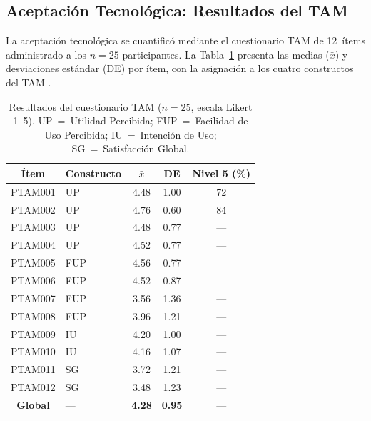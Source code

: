 \documentclass[journal]{IEEEtran}
\begin{document}
		\subsection{Aceptaci\'on Tecnol\'ogica: Resultados del TAM}
			
			La aceptaci\'on tecnol\'ogica se cuantific\'o mediante el cuestionario TAM de 12~\'items administrado a los $n=25$ participantes. La Tabla~\ref{tab:tam} presenta las medias ($\bar{x}$) y desviaciones est\'andar (DE) por \'item, con la asignaci\'on a los cuatro constructos del TAM \cite{davis1989}.
			
			\begin{table}[!t]
				\caption{Resultados del cuestionario TAM ($n=25$, escala Likert 1--5). UP~=~Utilidad Percibida; FUP~=~Facilidad de Uso Percibida; IU~=~Intenci\'on de Uso; SG~=~Satisfacci\'on Global.}
				\label{tab:tam}
				\centering
				\small
				\renewcommand{\arraystretch}{1.25}
				\begin{tabular}{clccc}
					\toprule
					\textbf{\'Item} & \textbf{Constructo} & \textbf{$\bar{x}$} & \textbf{DE} & \textbf{Nivel 5 (\%)} \\
					\midrule
					PTAM001 & UP  & 4.48 & 1.00 & 72 \\
					PTAM002 & UP  & 4.76 & 0.60 & 84 \\
					PTAM003 & UP  & 4.48 & 0.77 & --- \\
					PTAM004 & UP  & 4.52 & 0.77 & --- \\
					PTAM005 & FUP & 4.56 & 0.77 & --- \\
					PTAM006 & FUP & 4.52 & 0.87 & --- \\
					PTAM007 & FUP & 3.56 & 1.36 & --- \\
					PTAM008 & FUP & 3.96 & 1.21 & --- \\
					PTAM009 & IU  & 4.20 & 1.00 & --- \\
					PTAM010 & IU  & 4.16 & 1.07 & --- \\
					PTAM011 & SG  & 3.72 & 1.21 & --- \\
					PTAM012 & SG  & 3.48 & 1.23 & --- \\
					\midrule
					\textbf{Global} & --- & \textbf{4.28} & \textbf{0.95} & --- \\
					\bottomrule
				\end{tabular}
			\end{table}
			
\end{document}
